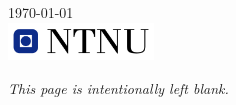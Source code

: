 \documentclass[12pt]{article}
\begin{document}
\begin{titlepage}

{\large \today}\\[2cm] %


\includegraphics[height=10mm]{ntnu-logo.jpg}\\[1cm] %
 

\vfill %

\end{titlepage}

\newpage
\clearpage
\newpage
\textit{This page is intentionally left blank.}
\clearpage
\tableofcontents
\clearpage





















\end{document}

